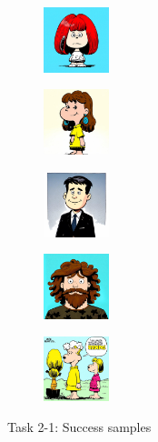 \documentclass{article}
\begin{document}
\begin{enumerate}
\begin{enumerate}
\begin{figure}[h!]
\begin{minipage}{0.8\textwidth}
						\begin{subfigure}[b]{0.18\textwidth}
							\centering
							\includegraphics[height=1.9cm]{000002_diff3}
						\end{subfigure}
						\hfill
						\begin{subfigure}[b]{0.18\textwidth}
							\centering
							\includegraphics[height=1.9cm]{000073_diff3}
						\end{subfigure}
						\hfill
						\begin{subfigure}[b]{0.18\textwidth}
							\centering
							\includegraphics[height=1.9cm]{000012_diff3}
						\end{subfigure}
						\hfill
						\begin{subfigure}[b]{0.18\textwidth}
							\centering
							\includegraphics[height=1.9cm]{000020_diff3}
						\end{subfigure}
						\hfill
						\begin{subfigure}[b]{0.18\textwidth}
							\centering
							\includegraphics[height=1.9cm]{000022_diff3}
						\end{subfigure}

						\caption{Task 2-1: Success samples}
						\vspace{0.6cm} %


\end{minipage}
\end{figure}
\end{enumerate}
\end{enumerate}
\end{document}
